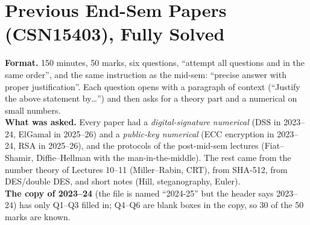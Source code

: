 \clearpage
\section{Previous End-Sem Papers (CSN15403), Fully Solved}\label{q:endsem}

\begin{keybox}[title=What the two end-sem papers tell you]
\textbf{Format.} 150 minutes, 50 marks, six questions, ``attempt all questions and in the same order'', and the same instruction as the mid-sem: ``precise answer with proper justification''. Each question opens with a paragraph of context (``Justify the above statement by\dots'') and then asks for a theory part and a numerical on small numbers.\\
\textbf{What was asked.} Every paper had a \emph{digital-signature numerical} (DSS in 2023--24, ElGamal in 2025--26) and a \emph{public-key numerical} (ECC encryption in 2023--24, RSA in 2025--26), and the protocols of the post-mid-sem lectures (Fiat--Shamir, Diffie--Hellman with the man-in-the-middle). The rest came from the number theory of Lectures 10--11 (Miller--Rabin, CRT), from SHA-512, from DES/double DES, and short notes (Hill, steganography, Euler).\\
\textbf{The copy of 2023--24} (the file is named ``2024-25'' but the header says 2023--24) has only Q1--Q3 filled in; Q4--Q6 are blank boxes in the copy, so 30 of the 50 marks are known.
\end{keybox}

